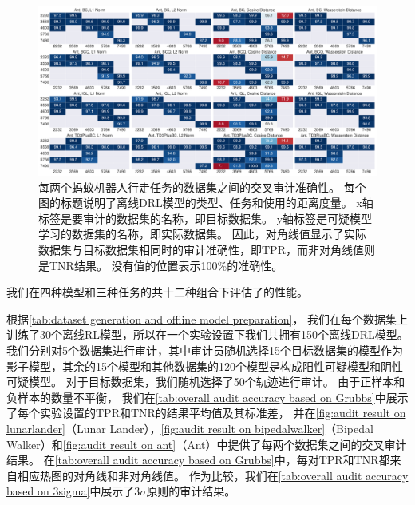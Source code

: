 \begin{figure}[!ht]
    \includegraphics[width=\hsize]{figure/orl_auditor/overall_sac_ant-v2_20230130182513257.pdf}
    \caption{
    每两个蚂蚁机器人行走任务的数据集之间的交叉审计准确性。
    每个图的标题说明了离线DRL模型的类型、任务和使用的距离度量。
    x轴标签是要审计的数据集的名称，即目标数据集。
    y轴标签是可疑模型学习的数据集的名称，即实际数据集。
    因此，对角线值显示了实际数据集与目标数据集相同时的审计准确性，即TPR，而非对角线值则是TNR结果。
    没有值的位置表示100\%的准确性。
    }
    \label{fig:audit result on ant}
\end{figure}



我们在四种模型和三种任务的共十二种组合下评估了\sysnameo 的性能。

根据\autoref{tab:dataset generation and offline model preparation}，
我们在每个数据集上训练了30个离线RL模型，所以在一个实验设置下我们共拥有150个离线DRL模型。
我们分别对5个数据集进行审计，其中审计员随机选择15个目标数据集的模型作为影子模型，其余的15个模型和其他数据集的120个模型是构成阳性可疑模型和阴性可疑模型。
对于目标数据集，我们随机选择了50个轨迹进行审计。
由于正样本和负样本的数量不平衡，
我们在\autoref{tab:overall audit accuracy based on Grubbs}中展示了每个实验设置的TPR和TNR的结果平均值及其标准差，
并在\autoref{fig:audit result on lunarlander}（Lunar Lander），\autoref{fig:audit result on bipedalwalker}（Bipedal Walker）和\autoref{fig:audit result on ant}（Ant）中提供了每两个数据集之间的交叉审计结果。
在\autoref{tab:overall audit accuracy based on Grubbs}中，每对TPR和TNR都来自相应热图的对角线和非对角线值。
作为比较，我们在\autoref{tab:overall audit accuracy based on 3sigma}中展示了3$\sigma$原则的审计结果。

